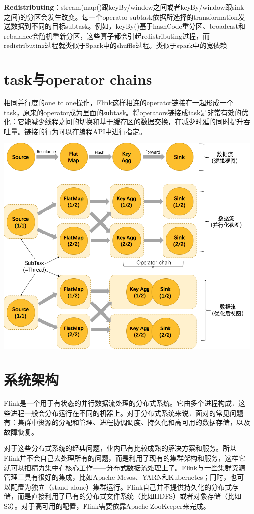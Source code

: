 \documentclass[oneside]{ctexbook}
\begin{document}
\textbf{Redistributing}：stream(map()跟keyBy/window之间或者keyBy/window跟sink之间)的分区会发生改变。每一个operator subtask依据所选择的transformation发送数据到不同的目标subtask。例如，keyBy()基于hashCode重分区、broadcast和rebalance会随机重新分区，这些算子都会引起redistributing过程，而redistributing过程就类似于Spark中的shuffle过程。类似于spark中的宽依赖

\section{task与operator chains}

相同并行度的one to one操作，Flink这样相连的operator链接在一起形成一个task，原来的operator成为里面的subtask。将operators链接成task是非常有效的优化：它能减少线程之间的切换和基于缓存区的数据交换，在减少时延的同时提升吞吐量。链接的行为可以在编程API中进行指定。

\noindent \includegraphics[width=\textwidth]{operatorschains.png}

\section{系统架构}

Flink是一个用于有状态的并行数据流处理的分布式系统。它由多个进程构成，这些进程一般会分布运行在不同的机器上。对于分布式系统来说，面对的常见问题有：集群中资源的分配和管理、进程协调调度、持久化和高可用的数据存储，以及故障恢复。

对于这些分布式系统的经典问题，业内已有比较成熟的解决方案和服务。所以Flink并不会自己去处理所有的问题，而是利用了现有的集群架构和服务，这样它就可以把精力集中在核心工作——分布式数据流处理上了。Flink与一些集群资源管理工具有很好的集成，比如Apache Mesos、YARN和Kubernetes；同时，也可以配置为独立（stand-alone）集群运行。Flink自己并不提供持久化的分布式存储，而是直接利用了已有的分布式文件系统（比如HDFS）或者对象存储（比如S3）。对于高可用的配置，Flink需要依靠Apache ZooKeeper来完成。
\end{document}
